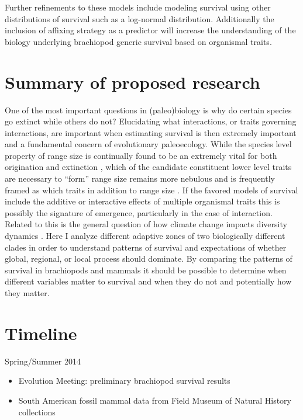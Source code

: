 \documentclass[12pt,letterpaper]{article}
\begin{document}
Further refinements to these models include modeling survival using other distributions of survival such as a log-normal distribution. Additionally the inclusion of affixing strategy as a predictor will increase the understanding of the biology underlying brachiopod generic survival based on organismal traits.

\section{Summary of proposed research}
One of the most important questions in (paleo)biology is why do certain species go extinct while others do not? Elucidating what interactions, or traits governing interactions, are important when estimating survival is then extremely important and a fundamental concern of evolutionary paleoecology. While the species level property of range size is continually found to be an extremely vital for both origination and extinction \citep{Roy2009c,Foote2013,Jablonski2003,Jablonski1987,Harnik2013}, which of the candidate constituent lower level traits are necessary to ``form'' range size remains more nebulous and is frequently framed as which traits in addition to range size \citep{Foote2013,Harnik2011,Nurnberg2013a}. If the favored models of survival include the additive or interactive effects of multiple organismal traits this is possibly the signature of emergence, particularly in the case of interaction. Related to this is the general question of how climate change impacts diversity dynamics \citep{Barnosky2001a,Alroy2000g,Figueirido2012,Olszewski2004}.
Here I analyze different adaptive zones of two biologically different clades in order to understand patterns of survival and expectations of whether global, regional, or local process should dominate. By comparing the patterns of survival in brachiopods and mammals it should be possible to determine when different variables matter to survival and when they do not and potentially how they matter.


\clearpage
\section{Timeline}

Spring/Summer 2014
\begin{itemize}
  \item Evolution Meeting: preliminary brachiopod survival results
  \item South American fossil mammal data from Field Museum of Natural History collections
\end{itemize}
\end{document}
